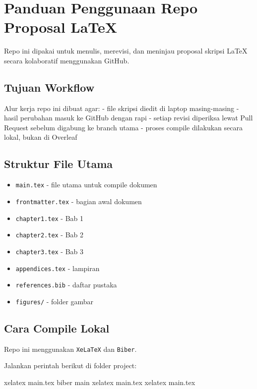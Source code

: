 \documentclass[
]{article}
\author{}
\date{}
\newenvironment{Shaded}{}{}
\newcommand{\ExtensionTok}[1]{#1}
\newcommand{\NormalTok}[1]{#1}
\providecommand{\tightlist}{%
  \setlength{\itemsep}{0pt}\setlength{\parskip}{0pt}}
\begin{document}
\section{Panduan Penggunaan Repo Proposal
LaTeX}\label{panduan-penggunaan-repo-proposal-latex}

Repo ini dipakai untuk menulis, merevisi, dan meninjau proposal skripsi
LaTeX secara kolaboratif menggunakan GitHub.

\subsection{Tujuan Workflow}\label{tujuan-workflow}

Alur kerja repo ini dibuat agar: - file skripsi diedit di laptop
masing-masing - hasil perubahan masuk ke GitHub dengan rapi - setiap
revisi diperiksa lewat Pull Request sebelum digabung ke branch utama -
proses compile dilakukan secara lokal, bukan di Overleaf

\subsection{Struktur File Utama}\label{struktur-file-utama}

\begin{itemize}
\tightlist
\item
  \texttt{main.tex} - file utama untuk compile dokumen
\item
  \texttt{frontmatter.tex} - bagian awal dokumen
\item
  \texttt{chapter1.tex} - Bab 1
\item
  \texttt{chapter2.tex} - Bab 2
\item
  \texttt{chapter3.tex} - Bab 3
\item
  \texttt{appendices.tex} - lampiran
\item
  \texttt{references.bib} - daftar pustaka
\item
  \texttt{figures/} - folder gambar
\end{itemize}

\subsection{Cara Compile Lokal}\label{cara-compile-lokal}

Repo ini menggunakan \texttt{XeLaTeX} dan \texttt{Biber}.

Jalankan perintah berikut di folder project:

\begin{Shaded}
\begin{Highlighting}[]
\ExtensionTok{xelatex}\NormalTok{ main.tex}
\ExtensionTok{biber}\NormalTok{ main}
\ExtensionTok{xelatex}\NormalTok{ main.tex}
\ExtensionTok{xelatex}\NormalTok{ main.tex}
\end{Highlighting}
\end{Shaded}
\end{document}
